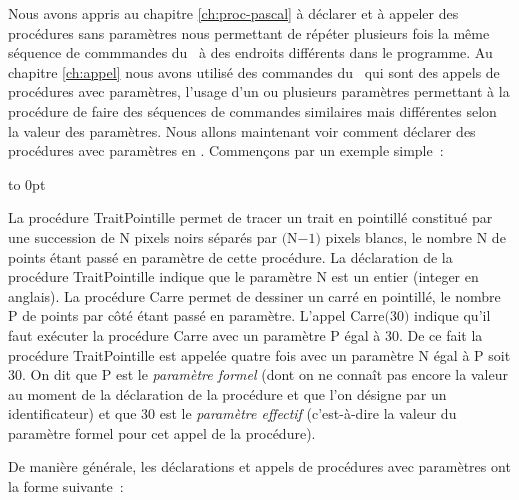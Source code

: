 Nous avons appris au chapitre \ref{ch:proc-pascal} à déclarer et à appeler des procédures sans paramètres
nous permettant de répéter plusieurs fois la même séquence de commmandes du
\robot\ à des endroits différents dans le programme. Au chapitre \ref{ch:appel} nous avons
utilisé des commandes du \robot\ qui sont des appels de procédures avec paramètres,
l'usage d'un ou plusieurs paramètres per\-met\-tant à la procédure de faire des séquences
de commandes similaires mais différentes selon la valeur des paramètres. Nous allons maintenant
voir comment déclarer des procédures avec paramètres en \pascal. Commençons
par un exemple simple~:

\bigskip

 {\raggedright 
 \vbox to 0pt{\vspace*{\baselineskip}\vspace*{3cm}
 }%
 
 }
La procédure {\idt TraitPointille} permet de tracer un trait en pointillé cons\-ti\-tué par une succession de
{\idt N} pixels noirs séparés par $(${\idt N}$ - 1)$ pixels blancs, le nom\-bre {\idt N} de points étant
passé en paramètre de cette procédure.  La déclaration de la procédure {\idt TraitPointille} indique
que le paramètre {\idt N} est un entier ({\idt integer} en anglais).
La procédure {\idt Carre} permet de dessiner un carré
en pointillé, le nombre {\idt P} de points par côté étant passé en paramètre. L'appel {\idt  Carre$($30$)$}
indique qu'il faut exécuter la procédure {\idt Carre} avec un paramètre {\idt P} égal à 30. De ce fait la
procédure {\idt TraitPointille} est appelée quatre fois avec un paramètre {\idt N} égal à {\idt P} soit
30. On dit que {\idt P} est le {\em paramètre formel}  (dont on ne connaît pas encore la valeur
au moment de la déclaration de la procédure et que l'on désigne par un identificateur) et que 
30 est le {\em paramètre effectif} (c'est-à-dire
la valeur du paramètre formel pour cet appel de la procédure).

De manière générale, les déclarations et appels de procédures avec pa\-ra\-mè\-tres ont  la forme
suivante~:

